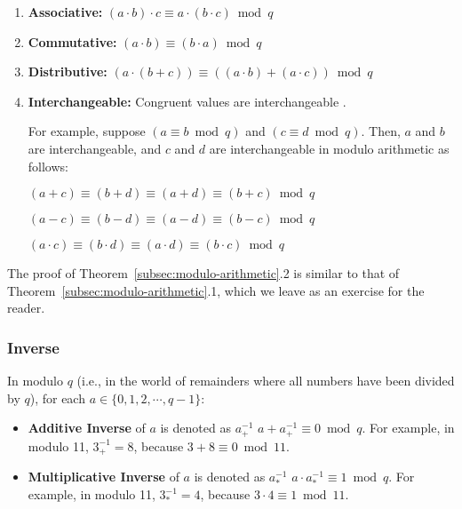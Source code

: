 \begin{tcolorbox}[title={\textbf{\tboxtheorem{\ref*{subsec:modulo-arithmetic}.2} Properties of Modulo Arithmetic}}]

\begin{enumerate}
\item \textbf{Associative:} $(a \cdot b) \cdot c \equiv a \cdot (b \cdot c) \bmod q$

\item \textbf{Commutative:} $(a \cdot b) \equiv (b \cdot a) \bmod q$

\item \textbf{Distributive:} $(a \cdot (b + c)) \equiv ((a \cdot b) + (a \cdot c))  \bmod q$

\item \textbf{Interchangeable:} Congruent values are interchangeable . 

For example, suppose $(a \equiv b \bmod q)$ and $(c \equiv d \bmod q)$. Then, $a$ and $b$ are interchangeable, and $c$ and $d$ are interchangeable in modulo arithmetic as follows:

$(a + c) \equiv (b + d) \equiv (a + d) \equiv (b + c) \bmod q$

$(a - c) \equiv (b - d) \equiv (a - d) \equiv (b - c) \bmod q$

$(a \cdot c) \equiv (b \cdot d) \equiv (a \cdot d) \equiv (b \cdot c) \bmod q$

\end{enumerate}

\end{tcolorbox}

The proof of Theorem~\ref*{subsec:modulo-arithmetic}.2 is similar to that of Theorem~\ref*{subsec:modulo-arithmetic}.1, which we leave as an exercise for the reader. 


\subsubsection{Inverse}
\label{subsec:modulo-inverse}

\begin{tcolorbox}[title={\textbf{\tboxdef{\ref*{subsec:modulo-inverse}} Inverse in Modulo Arithmetic}}]

In modulo $q$ (i.e., in the world of remainders where all numbers have been divided by $q$), for each $a \in \{0, 1, 2, \cdots, q-1\}$:

\begin{itemize}

\item \textbf{Additive Inverse} of $a$ is denoted as $a_+^{-1}$  $a + a_+^{-1} \equiv 0 \bmod q$. For example, in modulo 11, $3_+^{-1} = 8$, because $3 + 8 \equiv 0 \bmod 11$.

\item \textbf{Multiplicative Inverse} of $a$ is denoted as $a_*^{-1}$  $a \cdot a_*^{-1} \equiv 1 \bmod q$. For example, in modulo 11, $3_*^{-1} = 4$, because $3 \cdot 4 \equiv 1 \bmod 11$.

\end{itemize}

\end{tcolorbox}

